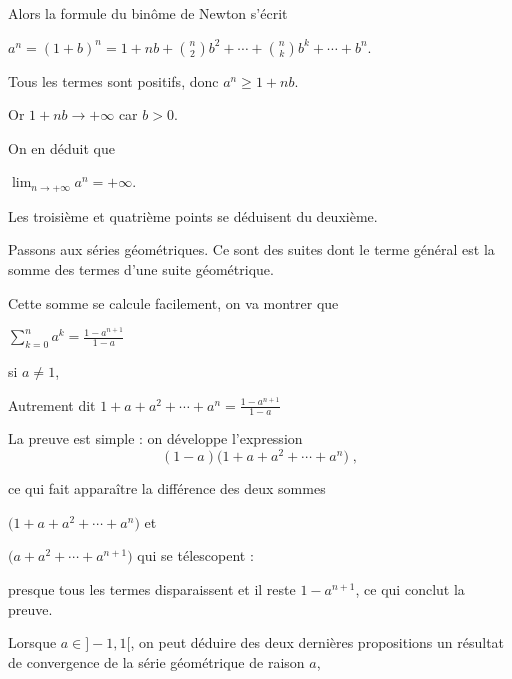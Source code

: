 Alors la formule du binôme de Newton s'écrit

$a^n=(1+b)^n=1+nb+\binom{n}{2}b^2+\cdots+\binom{n}{k}b^k+\cdots+b^n$. 

\change

Tous les termes sont positifs,  donc  $a^n\geq 1+nb$. 

\change
 
Or $1+nb\to+\infty$ car $b>0$. 


\change

On en déduit que 

$\lim_{n\to +\infty} a^n=+\infty$. 

Les troisième et quatrième points se déduisent du deuxième.







\diapo

Passons aux séries géométriques. Ce sont des suites dont le terme général 
est la somme des termes d'une suite géométrique.

Cette somme se calcule facilement, on va montrer que

$\sum_{k=0}^na^k=\frac{1-a^{n+1}}{1-a} $

si $a\neq 1$,

\change


Autrement dit $1+a+a^2+\cdots+a^n=\frac{1-a^{n+1}}{1-a} $



\change


La preuve est simple : on développe l'expression 
\[(1-a)\big(1+a+a^2+\cdots+a^n \big)\; ,\] 

\change

ce qui fait apparaître la différence des deux sommes 

$\big(1+a+a^2+\cdots+a^n \big)$ et 

$\big(a+a^2+\cdots+a^{n+1} \big)$ qui se \og{} télescopent \fg{}:

\change

presque tous les termes disparaissent et il reste $1-a^{n+1}$, ce qui conclut la preuve.





 \diapo


Lorsque $a\in ]-1,1[$, on peut déduire des deux dernières propositions 
un résultat de convergence de la série géométrique de raison $a$, 

